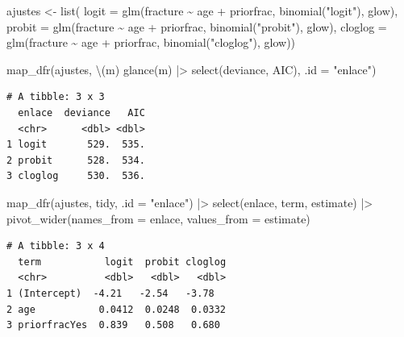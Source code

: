 \documentclass[
  letterpaper,
  DIV=11,
  numbers=noendperiod]{scrartcl}
\newenvironment{Shaded}{\begin{snugshade}}{\end{snugshade}}
\newcommand{\AttributeTok}[1]{\textcolor[rgb]{0.40,0.45,0.13}{#1}}
\newcommand{\FunctionTok}[1]{\textcolor[rgb]{0.28,0.35,0.67}{#1}}
\newcommand{\NormalTok}[1]{\textcolor[rgb]{0.00,0.23,0.31}{#1}}
\newcommand{\OtherTok}[1]{\textcolor[rgb]{0.00,0.23,0.31}{#1}}
\newcommand{\SpecialCharTok}[1]{\textcolor[rgb]{0.37,0.37,0.37}{#1}}
\newcommand{\StringTok}[1]{\textcolor[rgb]{0.13,0.47,0.30}{#1}}
\begin{document}
\begin{Shaded}
\begin{Highlighting}[]
\NormalTok{ajustes }\OtherTok{\textless{}{-}} \FunctionTok{list}\NormalTok{(}
  \AttributeTok{logit   =} \FunctionTok{glm}\NormalTok{(fracture }\SpecialCharTok{\textasciitilde{}}\NormalTok{ age }\SpecialCharTok{+}\NormalTok{ priorfrac, }\FunctionTok{binomial}\NormalTok{(}\StringTok{"logit"}\NormalTok{),   glow),}
  \AttributeTok{probit  =} \FunctionTok{glm}\NormalTok{(fracture }\SpecialCharTok{\textasciitilde{}}\NormalTok{ age }\SpecialCharTok{+}\NormalTok{ priorfrac, }\FunctionTok{binomial}\NormalTok{(}\StringTok{"probit"}\NormalTok{),  glow),}
  \AttributeTok{cloglog =} \FunctionTok{glm}\NormalTok{(fracture }\SpecialCharTok{\textasciitilde{}}\NormalTok{ age }\SpecialCharTok{+}\NormalTok{ priorfrac, }\FunctionTok{binomial}\NormalTok{(}\StringTok{"cloglog"}\NormalTok{), glow))}

\FunctionTok{map\_dfr}\NormalTok{(ajustes, \textbackslash{}(m) }\FunctionTok{glance}\NormalTok{(m) }\SpecialCharTok{|\textgreater{}} \FunctionTok{select}\NormalTok{(deviance, AIC), }\AttributeTok{.id =} \StringTok{"enlace"}\NormalTok{)}
\end{Highlighting}
\end{Shaded}

\begin{verbatim}
# A tibble: 3 x 3
  enlace  deviance   AIC
  <chr>      <dbl> <dbl>
1 logit       529.  535.
2 probit      528.  534.
3 cloglog     530.  536.
\end{verbatim}

\begin{Shaded}
\begin{Highlighting}[]
\FunctionTok{map\_dfr}\NormalTok{(ajustes, tidy, }\AttributeTok{.id =} \StringTok{"enlace"}\NormalTok{) }\SpecialCharTok{|\textgreater{}}
  \FunctionTok{select}\NormalTok{(enlace, term, estimate) }\SpecialCharTok{|\textgreater{}}
  \FunctionTok{pivot\_wider}\NormalTok{(}\AttributeTok{names\_from =}\NormalTok{ enlace, }\AttributeTok{values\_from =}\NormalTok{ estimate)}
\end{Highlighting}
\end{Shaded}

\begin{verbatim}
# A tibble: 3 x 4
  term           logit  probit cloglog
  <chr>          <dbl>   <dbl>   <dbl>
1 (Intercept)  -4.21   -2.54   -3.78  
2 age           0.0412  0.0248  0.0332
3 priorfracYes  0.839   0.508   0.680 
\end{verbatim}
\end{document}
